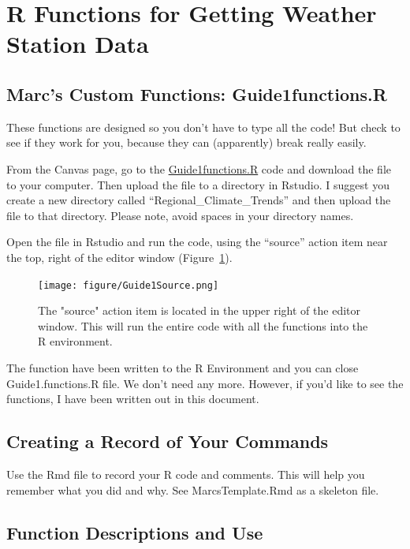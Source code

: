 \documentclass{article}\usepackage[]{graphicx}\usepackage[dvipsnames]{xcolor}
\begin{document}
\section{R Functions for Getting Weather Station Data}

\subsection{Marc's Custom Functions: Guide1functions.R}



These functions are designed so you don't have to type all the code! But check to see if they work for you, because they can (apparently) break really easily. 

From the Canvas page, go to the \href{https://github.com/marclos/RTricks/blob/master/04_Regional_Climate_Trends/Guides/Guide1functions.R}{Guide1functions.R} code and download the file to your computer. Then upload the file to a directory in Rstudio. I suggest you create a new directory called ``Regional\_Climate\_Trends'' and then upload the file to that directory. Please note, avoid spaces in your directory names.

Open the file in Rstudio and run the code, using the ``source'' action item near the top, right of the editor window (Figure~\ref{fig:source_code}).

\begin{figure}[h]
\centering
\texttt{[image: figure/Guide1Source.png]}
\caption{The "source" action item is located in the upper right of the editor window. This will run the entire code with all the functions into the R environment.}
\label{fig:source_code}
\end{figure}

The function have been written to the R Environment and you can close Guide1.functions.R file. We don't need any more. However, if you'd like to see the functions, I have been written out in this document. 

\subsection{Creating a Record of Your Commands}

Use the Rmd file to record your R code and comments. This will help you remember what you did and why. See MarcsTemplate.Rmd as a skeleton file. 

\subsection{Function Descriptions and Use}
\end{document}
